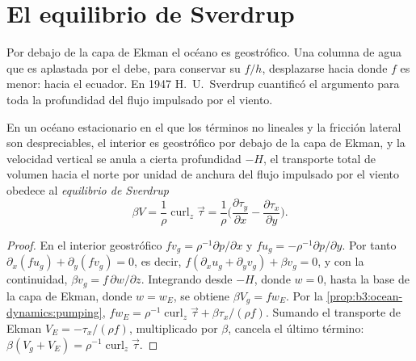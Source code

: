 \section{El equilibrio de Sverdrup}\label{sec:b3:ocean-dynamics:sverdrup}

Por debajo de la capa de Ekman el océano es geostrófico. Una columna de agua que es
aplastada por el  debe, para conservar su  $f/h$,
desplazarse hacia donde $f$ es menor: hacia el ecuador. En 1947 H.~U.~Sverdrup
cuantificó el argumento para toda la profundidad del flujo impulsado por el viento.

\begin{theorem}\label{thm:b3:ocean-dynamics:sverdrup}
En un océano estacionario en el que los términos no lineales y la fricción lateral
son despreciables, el interior es geostrófico por debajo de la capa de Ekman, y la
velocidad vertical se anula a cierta profundidad $-H$, el transporte total de volumen hacia el norte
por unidad de anchura del flujo impulsado por el viento obedece al \emph{equilibrio
de Sverdrup}
\[
\beta V = \frac{1}{\rho}\operatorname{curl}_z\vec\tau
= \frac{1}{\rho}\Big(\frac{\partial\tau_y}{\partial x} -
\frac{\partial\tau_x}{\partial y}\Big) .
\]
\end{theorem}

\begin{proof}
En el interior geostrófico $fv_g = \rho^{-1}\partial p/\partial x$ y
$fu_g = -\rho^{-1}\partial p/\partial y$. Por tanto $\partial_x(fu_g) +
\partial_y(fv_g) = 0$, es decir, $f(\partial_xu_g + \partial_yv_g) + \beta
v_g = 0$, y con la continuidad, $\beta v_g = f\,\partial w/\partial z$.
Integrando desde $-H$, donde $w = 0$, hasta la base de la capa de Ekman,
donde $w = w_E$, se obtiene $\beta V_g = fw_E$. Por
la \cref{prop:b3:ocean-dynamics:pumping}, $fw_E = \rho^{-1}\operatorname{curl}_z
\vec\tau + \beta\tau_x/(\rho f)$. Sumando el transporte de Ekman $V_E =
-\tau_x/(\rho f)$, multiplicado por $\beta$, cancela el último término:
$\beta(V_g + V_E) = \rho^{-1}\operatorname{curl}_z\vec\tau$.
\end{proof}

